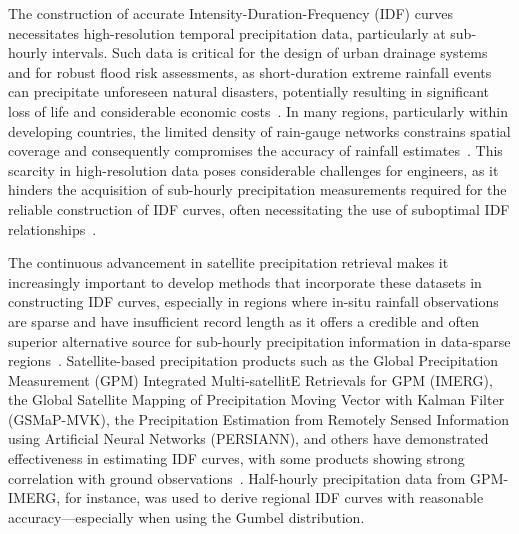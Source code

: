 The construction of accurate Intensity-Duration-Frequency (IDF) curves necessitates high-resolution temporal precipitation data, particularly at sub-hourly intervals. Such data is critical for the design of urban drainage systems and for robust flood risk assessments, as short-duration extreme rainfall events can precipitate unforeseen natural disasters, potentially resulting in significant loss of life and considerable economic costs~\cite{hess-28-375-2024}. In many regions, particularly within developing countries, the limited density of rain-gauge networks constrains spatial coverage and consequently compromises the accuracy of rainfall estimates~\cite{basumatary2016}. This scarcity in high-resolution data poses considerable challenges for engineers, as it hinders the acquisition of sub-hourly precipitation measurements required for the reliable construction of IDF curves, often necessitating the use of suboptimal IDF relationships~\cite{basumatary2016}.

\vspace{1em}

The continuous advancement in satellite precipitation retrieval makes it increasingly important to develop methods that incorporate these datasets in constructing IDF curves, especially in regions where in-situ rainfall observations are sparse and have insufficient record length as it offers a credible and often superior alternative source for sub-hourly precipitation information in data-sparse regions~\cite{ombadi2018}. Satellite-based precipitation products such as the Global Precipitation Measurement (GPM) Integrated Multi-satellitE Retrievals for GPM (IMERG), the Global Satellite Mapping of Precipitation Moving Vector with Kalman Filter (GSMaP-MVK), the Precipitation Estimation from Remotely Sensed Information using Artificial Neural Networks (PERSIANN), and others have demonstrated effectiveness in estimating IDF curves, with some products showing strong correlation with ground observations~\cite{ombadi2018, rs14195032}. Half-hourly precipitation data from GPM-IMERG, for instance, was used to derive regional IDF curves with reasonable accuracy—especially when using the Gumbel distribution.~\cite{rs14195032}